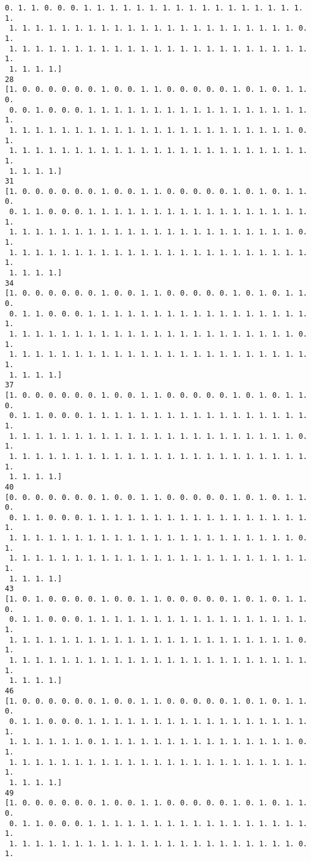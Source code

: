 \documentclass[11pt]{article}
\begin{document}
\begin{Verbatim}[commandchars=\\\{\}]
 0. 1. 1. 0. 0. 0. 1. 1. 1. 1. 1. 1. 1. 1. 1. 1. 1. 1. 1. 1. 1. 1. 1. 1.
 1. 1. 1. 1. 1. 1. 1. 1. 1. 1. 1. 1. 1. 1. 1. 1. 1. 1. 1. 1. 1. 1. 0. 1.
 1. 1. 1. 1. 1. 1. 1. 1. 1. 1. 1. 1. 1. 1. 1. 1. 1. 1. 1. 1. 1. 1. 1. 1.
 1. 1. 1. 1.]
28
[1. 0. 0. 0. 0. 0. 0. 1. 0. 0. 1. 1. 0. 0. 0. 0. 0. 1. 0. 1. 0. 1. 1. 0.
 0. 0. 1. 0. 0. 0. 1. 1. 1. 1. 1. 1. 1. 1. 1. 1. 1. 1. 1. 1. 1. 1. 1. 1.
 1. 1. 1. 1. 1. 1. 1. 1. 1. 1. 1. 1. 1. 1. 1. 1. 1. 1. 1. 1. 1. 1. 0. 1.
 1. 1. 1. 1. 1. 1. 1. 1. 1. 1. 1. 1. 1. 1. 1. 1. 1. 1. 1. 1. 1. 1. 1. 1.
 1. 1. 1. 1.]
31
[1. 0. 0. 0. 0. 0. 0. 1. 0. 0. 1. 1. 0. 0. 0. 0. 0. 1. 0. 1. 0. 1. 1. 0.
 0. 1. 1. 0. 0. 0. 1. 1. 1. 1. 1. 1. 1. 1. 1. 1. 1. 1. 1. 1. 1. 1. 1. 1.
 1. 1. 1. 1. 1. 1. 1. 1. 1. 1. 1. 1. 1. 1. 1. 1. 1. 1. 1. 1. 1. 1. 0. 1.
 1. 1. 1. 1. 1. 1. 1. 1. 1. 1. 1. 1. 1. 1. 1. 1. 1. 1. 1. 1. 1. 1. 1. 1.
 1. 1. 1. 1.]
34
[1. 0. 0. 0. 0. 0. 0. 1. 0. 0. 1. 1. 0. 0. 0. 0. 0. 1. 0. 1. 0. 1. 1. 0.
 0. 1. 1. 0. 0. 0. 1. 1. 1. 1. 1. 1. 1. 1. 1. 1. 1. 1. 1. 1. 1. 1. 1. 1.
 1. 1. 1. 1. 1. 1. 1. 1. 1. 1. 1. 1. 1. 1. 1. 1. 1. 1. 1. 1. 1. 1. 0. 1.
 1. 1. 1. 1. 1. 1. 1. 1. 1. 1. 1. 1. 1. 1. 1. 1. 1. 1. 1. 1. 1. 1. 1. 1.
 1. 1. 1. 1.]
37
[1. 0. 0. 0. 0. 0. 0. 1. 0. 0. 1. 1. 0. 0. 0. 0. 0. 1. 0. 1. 0. 1. 1. 0.
 0. 1. 1. 0. 0. 0. 1. 1. 1. 1. 1. 1. 1. 1. 1. 1. 1. 1. 1. 1. 1. 1. 1. 1.
 1. 1. 1. 1. 1. 1. 1. 1. 1. 1. 1. 1. 1. 1. 1. 1. 1. 1. 1. 1. 1. 1. 0. 1.
 1. 1. 1. 1. 1. 1. 1. 1. 1. 1. 1. 1. 1. 1. 1. 1. 1. 1. 1. 1. 1. 1. 1. 1.
 1. 1. 1. 1.]
40
[0. 0. 0. 0. 0. 0. 0. 1. 0. 0. 1. 1. 0. 0. 0. 0. 0. 1. 0. 1. 0. 1. 1. 0.
 0. 1. 1. 0. 0. 0. 1. 1. 1. 1. 1. 1. 1. 1. 1. 1. 1. 1. 1. 1. 1. 1. 1. 1.
 1. 1. 1. 1. 1. 1. 1. 1. 1. 1. 1. 1. 1. 1. 1. 1. 1. 1. 1. 1. 1. 1. 0. 1.
 1. 1. 1. 1. 1. 1. 1. 1. 1. 1. 1. 1. 1. 1. 1. 1. 1. 1. 1. 1. 1. 1. 1. 1.
 1. 1. 1. 1.]
43
[1. 0. 1. 0. 0. 0. 0. 1. 0. 0. 1. 1. 0. 0. 0. 0. 0. 1. 0. 1. 0. 1. 1. 0.
 0. 1. 1. 0. 0. 0. 1. 1. 1. 1. 1. 1. 1. 1. 1. 1. 1. 1. 1. 1. 1. 1. 1. 1.
 1. 1. 1. 1. 1. 1. 1. 1. 1. 1. 1. 1. 1. 1. 1. 1. 1. 1. 1. 1. 1. 1. 0. 1.
 1. 1. 1. 1. 1. 1. 1. 1. 1. 1. 1. 1. 1. 1. 1. 1. 1. 1. 1. 1. 1. 1. 1. 1.
 1. 1. 1. 1.]
46
[1. 0. 0. 0. 0. 0. 0. 1. 0. 0. 1. 1. 0. 0. 0. 0. 0. 1. 0. 1. 0. 1. 1. 0.
 0. 1. 1. 0. 0. 0. 1. 1. 1. 1. 1. 1. 1. 1. 1. 1. 1. 1. 1. 1. 1. 1. 1. 1.
 1. 1. 1. 1. 1. 1. 0. 1. 1. 1. 1. 1. 1. 1. 1. 1. 1. 1. 1. 1. 1. 1. 0. 1.
 1. 1. 1. 1. 1. 1. 1. 1. 1. 1. 1. 1. 1. 1. 1. 1. 1. 1. 1. 1. 1. 1. 1. 1.
 1. 1. 1. 1.]
49
[1. 0. 0. 0. 0. 0. 0. 1. 0. 0. 1. 1. 0. 0. 0. 0. 0. 1. 0. 1. 0. 1. 1. 0.
 0. 1. 1. 0. 0. 0. 1. 1. 1. 1. 1. 1. 1. 1. 1. 1. 1. 1. 1. 1. 1. 1. 1. 1.
 1. 1. 1. 1. 1. 1. 1. 1. 1. 1. 1. 1. 1. 1. 1. 1. 1. 1. 1. 1. 1. 1. 0. 1.

\end{Verbatim}
\end{document}
